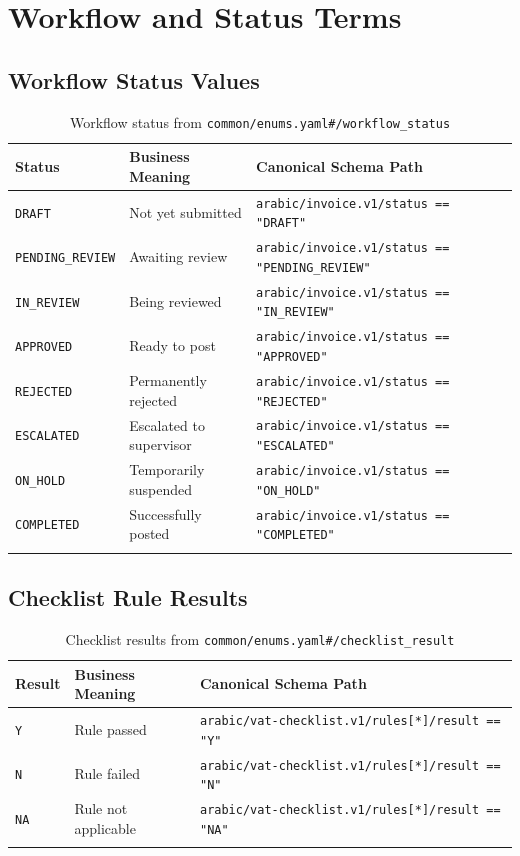 \documentclass[11pt,a4paper]{report}
\newcommand{\schemapath}[1]{\texttt{\textcolor{pathcolor}{#1}}}
\newcommand{\enumval}[1]{\texttt{\textcolor{sapgreen}{#1}}}
\begin{document}
\chapter{Workflow and Status Terms}

\section{Workflow Status Values}

\begin{longtable}{@{}p{3cm}p{3.5cm}p{5.5cm}@{}}
\toprule
\textbf{Status} & \textbf{Business Meaning} & \textbf{Canonical Schema Path} \\
\midrule
\endhead
\enumval{DRAFT} & Not yet submitted & \schemapath{arabic/invoice.v1/status == "DRAFT"} \\
\enumval{PENDING\_REVIEW} & Awaiting review & \schemapath{arabic/invoice.v1/status == "PENDING\_REVIEW"} \\
\enumval{IN\_REVIEW} & Being reviewed & \schemapath{arabic/invoice.v1/status == "IN\_REVIEW"} \\
\enumval{APPROVED} & Ready to post & \schemapath{arabic/invoice.v1/status == "APPROVED"} \\
\enumval{REJECTED} & Permanently rejected & \schemapath{arabic/invoice.v1/status == "REJECTED"} \\
\enumval{ESCALATED} & Escalated to supervisor & \schemapath{arabic/invoice.v1/status == "ESCALATED"} \\
\enumval{ON\_HOLD} & Temporarily suspended & \schemapath{arabic/invoice.v1/status == "ON\_HOLD"} \\
\enumval{COMPLETED} & Successfully posted & \schemapath{arabic/invoice.v1/status == "COMPLETED"} \\
\bottomrule
\caption{Workflow status from \schemapath{common/enums.yaml\#/workflow\_status}}
\end{longtable}

\section{Checklist Rule Results}

\begin{longtable}{@{}p{2cm}p{4cm}p{6cm}@{}}
\toprule
\textbf{Result} & \textbf{Business Meaning} & \textbf{Canonical Schema Path} \\
\midrule
\endhead
\enumval{Y} & Rule passed & \schemapath{arabic/vat-checklist.v1/rules[*]/result == "Y"} \\
\enumval{N} & Rule failed & \schemapath{arabic/vat-checklist.v1/rules[*]/result == "N"} \\
\enumval{NA} & Rule not applicable & \schemapath{arabic/vat-checklist.v1/rules[*]/result == "NA"} \\
\bottomrule
\caption{Checklist results from \schemapath{common/enums.yaml\#/checklist\_result}}
\end{longtable}
\end{document}
